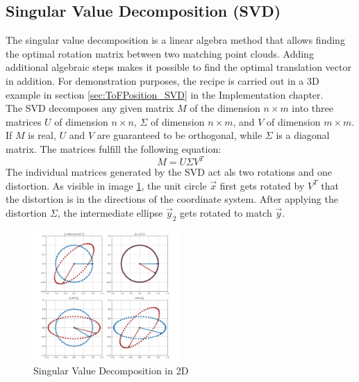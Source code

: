\subsection{Singular Value Decomposition (SVD)}
\label{sec:SVD}
The singular value decomposition is a linear algebra method that allows finding the optimal rotation matrix between two matching point clouds. Adding additional algebraic steps makes it possible to find the optimal translation vector in addition.\cite{SVD_ETH}
For demonstration purposes, the recipe is carried out in a 3D example in section \ref{sec:ToFPosition_SVD} in the Implementation chapter.\\
The SVD decomposes any given matrix $M$ of the dimension $n\times m$ into three matrices $U$ of dimension $n\times n$, $\Sigma$ of dimension $n\times m$, and $V$ of dimension $m\times m$.\cite{SVD_MIT} If $M$ is real, $U$ and $V$ are guaranteed to be orthogonal, while $\Sigma$ is a diagonal matrix. The matrices fulfill the following equation: 
\begin{equation*}
    M= U\Sigma V^{T}
\end{equation*}
The individual matrices generated by the SVD act als two rotations and one distortion. As visible in image \ref{im:SVD}, the unit circle $\vec{x}$ first gets rotated by $V^{T}$ that the distortion is in the directions of the coordinate system. After applying the distortion $\Sigma$, the intermediate ellipse $\vec{y}_{2}$ gets rotated to match $\vec{y}$.
\begin{figure}[H]
    \centering
    \includegraphics[width=0.5\textwidth]{images/SVD.svg}
    \caption{Singular Value Decomposition in 2D}
    \label{im:SVD}
\end{figure}


